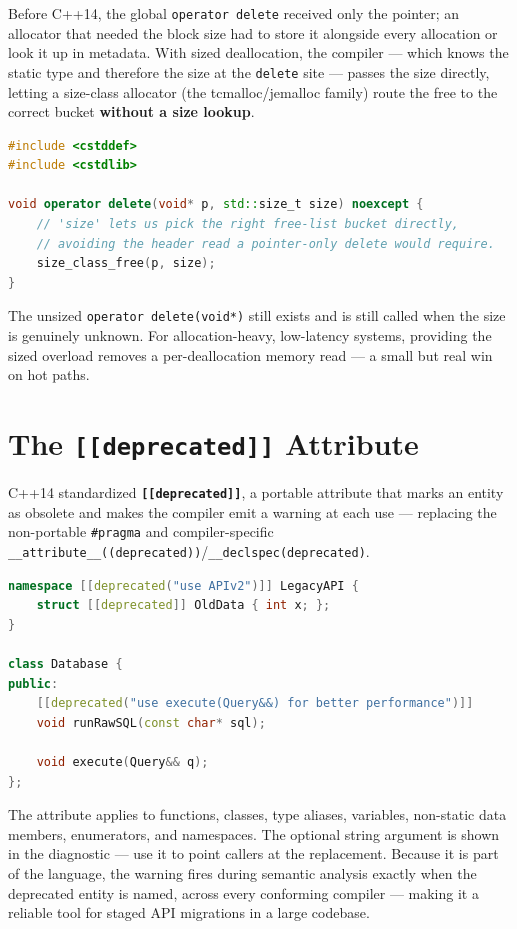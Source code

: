 Before C++14, the global \texttt{operator delete} received only the pointer; an allocator that needed the block size had to store it alongside every allocation or look it up in metadata. With sized deallocation, the compiler --- which knows the static type and therefore the size at the \texttt{delete} site --- passes the size directly, letting a size-class allocator (the tcmalloc/jemalloc family) route the free to the correct bucket \textbf{without a size lookup}.

\begin{lstlisting}[language=C++,caption={A custom allocator exploiting the size hint}]
#include <cstddef>
#include <cstdlib>

void operator delete(void* p, std::size_t size) noexcept {
    // 'size' lets us pick the right free-list bucket directly,
    // avoiding the header read a pointer-only delete would require.
    size_class_free(p, size);
}
\end{lstlisting}

The unsized \texttt{operator delete(void*)} still exists and is still called when the size is genuinely unknown. For allocation-heavy, low-latency systems, providing the sized overload removes a per-deallocation memory read --- a small but real win on hot paths.

\section{The \texttt{[[deprecated]]} Attribute}
\label{sec:c14-deprecated}

C++14 standardized \textbf{\texttt{[[deprecated]]}}, a portable attribute that marks an entity as obsolete and makes the compiler emit a warning at each use --- replacing the non-portable \texttt{\#pragma} and compiler-specific \texttt{\_\_attribute\_\_((deprecated))}/\texttt{\_\_declspec(deprecated)}.

\begin{lstlisting}[language=C++,caption={Deprecating functions, types, and namespaces}]
namespace [[deprecated("use APIv2")]] LegacyAPI {
    struct [[deprecated]] OldData { int x; };
}

class Database {
public:
    [[deprecated("use execute(Query&&) for better performance")]]
    void runRawSQL(const char* sql);

    void execute(Query&& q);
};
\end{lstlisting}

The attribute applies to functions, classes, type aliases, variables, non-static data members, enumerators, and namespaces. The optional string argument is shown in the diagnostic --- use it to point callers at the replacement. Because it is part of the language, the warning fires during semantic analysis exactly when the deprecated entity is named, across every conforming compiler --- making it a reliable tool for staged API migrations in a large codebase.

